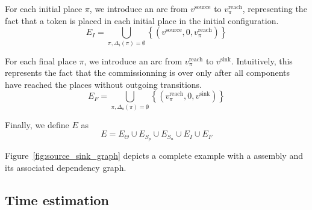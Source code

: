

For each initial place $\pi$, we introduce an arc from $v^\text{source}$
to $v_\pi^\text{reach}$, representing the fact that a token is placed in each
initial place in the initial configuration.
\[
E_I=\bigcup_{\pi, \Delta_i(\pi) = \emptyset}\left\{ \left(v^\text{source},0,v_\pi^\text{reach}\right)\right\} 
\]

For each final place $\pi$, we introduce an arc from $v_\pi^\text{reach}$
to $v^\text{sink}$. Intuitively, this represents the fact that the
commissionning is over only after all components have reached the
places without outgoing transitions.
\[
E_F=\bigcup_{\pi, \Delta_o(\pi) = \emptyset}\left\{ \left(v_\pi^\text{reach},0,v^\text{sink}\right)\right\} 
\]

Finally, we define $E$ as 
\[
E= E_{\Theta} \cup E_{S_p}\cup E_{S_u}\cup E_{I}\cup E_{F}
\]

Figure~\ref{fig:source_sink_graph} depicts a complete example with a \mad assembly and its associated dependency graph.



\subsection{Time estimation}

